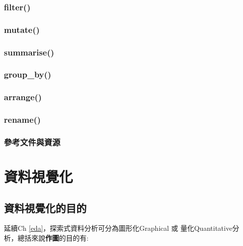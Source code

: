 \documentclass[
]{book}
\begin{document}
\hypertarget{filter}{%
\subsection{filter()}\label{filter}}

\hypertarget{mutate}{%
\subsection{mutate()}\label{mutate}}

\hypertarget{summarise}{%
\subsection{summarise()}\label{summarise}}

\hypertarget{group_by}{%
\subsection{group\_by()}\label{group_by}}

\hypertarget{arrange}{%
\subsection{arrange()}\label{arrange}}

\hypertarget{rename}{%
\subsection{rename()}\label{rename}}

\hypertarget{ux53c3ux8003ux6587ux4ef6ux8207ux8cc7ux6e90-1}{%
\subsection{參考文件與資源}\label{ux53c3ux8003ux6587ux4ef6ux8207ux8cc7ux6e90-1}}

\hypertarget{vis}{%
\chapter{資料視覺化}\label{vis}}

\hypertarget{ux8cc7ux6599ux8996ux89baux5316ux7684ux76eeux7684}{%
\section{資料視覺化的目的}\label{ux8cc7ux6599ux8996ux89baux5316ux7684ux76eeux7684}}

延續Ch \ref{eda}，探索式資料分析可分為圖形化Graphical 或 量化Quantitative分析，總括來說\textbf{作圖}的目的有:
\end{document}
